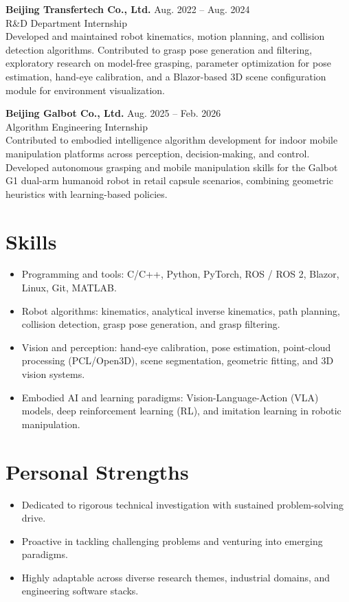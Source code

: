 \documentclass[11pt,a4paper]{article}
\newcommand{\entry}[4]{%
  \textbf{#1} \hfill #2\\
  {\color{textgray}#3} \hfill {#4}\\[-2pt]
}
\begin{document}
\entry{Beijing Transfertech Co., Ltd.}{Aug. 2022 -- Aug. 2024}{R\&D Department}{Internship}
Developed and maintained robot kinematics, motion planning, and collision detection algorithms. Contributed to grasp pose generation and filtering, exploratory research on model-free grasping, parameter optimization for pose estimation, hand-eye calibration, and a Blazor-based 3D scene configuration module for environment visualization.

\entry{Beijing Galbot Co., Ltd.}{Aug. 2025 -- Feb. 2026}{Algorithm Engineering}{Internship}
Contributed to embodied intelligence algorithm development for indoor mobile manipulation platforms across perception, decision-making, and control. Developed autonomous grasping and mobile manipulation skills for the Galbot G1 dual-arm humanoid robot in retail capsule scenarios, combining geometric heuristics with learning-based policies.

\section*{Skills}
\begin{itemize}
	\item Programming and tools: C/C++, Python, PyTorch, ROS / ROS 2, Blazor, Linux, Git, MATLAB.
	\item Robot algorithms: kinematics, analytical inverse kinematics, path planning, collision detection, grasp pose generation, and grasp filtering.
	\item Vision and perception: hand-eye calibration, pose estimation, point-cloud processing (PCL/Open3D), scene segmentation, geometric fitting, and 3D vision systems.
	\item Embodied AI and learning paradigms: Vision-Language-Action (VLA) models, deep reinforcement learning (RL), and imitation learning in robotic manipulation.
\end{itemize}

\section*{Personal Strengths}
\begin{itemize}
	\item Dedicated to rigorous technical investigation with sustained problem-solving drive.
	\item Proactive in tackling challenging problems and venturing into emerging paradigms.
	\item Highly adaptable across diverse research themes, industrial domains, and engineering software stacks.
\end{itemize}
\end{document}
